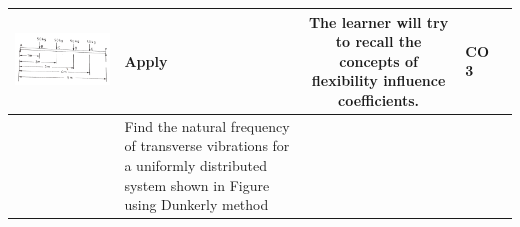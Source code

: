 \documentclass[11pt,paper=a4,answers]{exam}
\begin{document}
\begin{flushleft}
\begin{longtable}{|>{\centering\arraybackslash}p{0.8cm}  | >{\raggedright\arraybackslash}p{6.5cm}  | c | >{\raggedright\arraybackslash}p{5cm} |>{\centering\arraybackslash}p{1cm}|}
	\includegraphics[scale=0.25]{6_9.png}
&	Apply&	The learner will try to \textbf{recall} the concepts of flexibility influence coefficients. &	CO 3\\
	\hline
	4&Find the natural frequency of transverse vibrations for a uniformly distributed system shown in Figure  using Dunkerly method
	

\end{longtable}
\end{flushleft}
\end{document}
